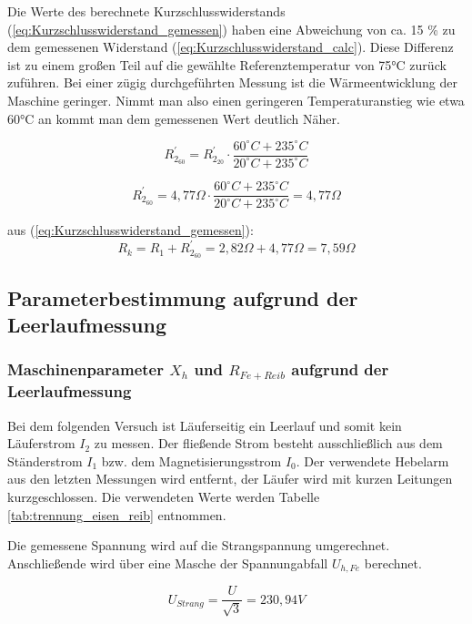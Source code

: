 \documentclass[conference]{IEEEtran}
\begin{document}
Die Werte des berechnete Kurzschlusswiderstands
(\ref{eq:Kurzschlusswiderstand_gemessen}) haben eine Abweichung von ca. 15 \% zu
dem gemessenen Widerstand (\ref{eq:Kurzschlusswiderstand_calc}). Diese Differenz
ist zu einem großen Teil auf die gewählte Referenztemperatur von 75°C zurück
zuführen. Bei einer zügig durchgeführten Messung ist die Wärmeentwicklung der
Maschine geringer. Nimmt man also einen geringeren Temperaturanstieg wie etwa
60°C an kommt man dem gemessenen Wert deutlich Näher.

\begin{equation}
    R_{2_{60}}^\prime = R_{2_{20}}^\prime \cdot \dfrac{60^\circ \si{C} + 235^\circ \si{C}}{20^\circ \si{C} + 235^\circ \si{C}}
\end{equation}

\begin{equation}
    R_{2_{60}}^\prime = 4,77 \Omega \cdot \dfrac{60^\circ \si{C} + 235^\circ \si{C}}{20^\circ \si{C} + 235^\circ \si{C}} = 4,77 \Omega
\end{equation}

aus (\ref{eq:Kurzschlusswiderstand_gemessen}):
\begin{equation}
    \boxed{R_{k} = R_{1} + R_{2_{60}}^\prime = 2,82 \Omega + 4,77 \Omega = 7,59 \Omega}
\end{equation}


\subsection{Parameterbestimmung aufgrund der Leerlaufmessung}
\subsubsection{Maschinenparameter $X_h$ und $R_{Fe+Reib}$ aufgrund der Leerlaufmessung}
Bei dem folgenden Versuch ist Läuferseitig ein Leerlauf und somit kein
Läuferstrom $I_{2}$ zu messen. Der fließende Strom besteht ausschließlich aus
dem Ständerstrom $I_{1}$ bzw. dem Magnetisierungsstrom $I_{0}$.
Der verwendete Hebelarm aus den letzten Messungen wird entfernt, der Läufer wird
mit kurzen Leitungen kurzgeschlossen.  Die verwendeten Werte werden Tabelle
\ref{tab:trennung_eisen_reib} entnommen.

Die gemessene Spannung wird auf die Strangspannung umgerechnet. Anschließende
wird über eine Masche der Spannungabfall $U_{h, Fe}$ berechnet.

\begin{equation}
    U_{Strang} = \dfrac{U}{ \sqrt{3} } = 230,94\si{V}
\end{equation}
\end{document}
